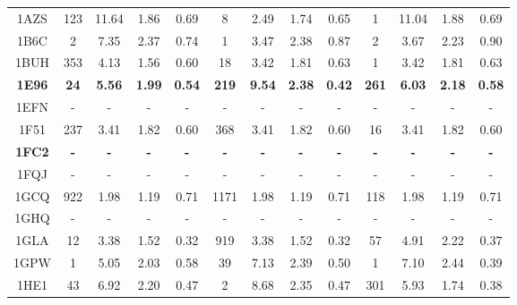 \begin{longtable}{c c c c c|c c c c|c c c c}
 {\tiny 1AZS} &{\tiny 123}&{\tiny 11.64}&{\tiny 1.86}&{\tiny 0.69} &{\tiny 8}&{\tiny 2.49}&{\tiny 1.74}&{\tiny 0.65} &{\tiny 1}&{\tiny 11.04}&{\tiny 1.88}&{\tiny 0.69}\\ 
 {\tiny 1B6C} &{\tiny 2}&{\tiny 7.35}&{\tiny 2.37}&{\tiny 0.74} &{\tiny 1}&{\tiny 3.47}&{\tiny 2.38}&{\tiny 0.87} &{\tiny 2}&{\tiny 3.67}&{\tiny 2.23}&{\tiny 0.90}\\ 
 {\tiny 1BUH} &{\tiny 353}&{\tiny 4.13}&{\tiny 1.56}&{\tiny 0.60} &{\tiny 18}&{\tiny 3.42}&{\tiny 1.81}&{\tiny 0.63} &{\tiny 1}&{\tiny 3.42}&{\tiny 1.81}&{\tiny 0.63}\\ 
 \textbf{\tiny 1E96} &\textbf{\tiny 24}&\textbf{\tiny 5.56}&\textbf{\tiny 1.99}&\textbf{\tiny 0.54} &\textbf{\tiny 219}&\textbf{\tiny 9.54}&\textbf{\tiny 2.38}&\textbf{\tiny 0.42} &\textbf{\tiny 261}&\textbf{\tiny 6.03}&\textbf{\tiny 2.18}&\textbf{\tiny 0.58}\\ 
 {\tiny 1EFN} &{\tiny -}&{\tiny -}&{\tiny -}&{\tiny -} &{\tiny -}&{\tiny -}&{\tiny -}&{\tiny -} &{\tiny -}&{\tiny -}&{\tiny -}&{\tiny -}\\ 
 {\tiny 1F51} &{\tiny 237}&{\tiny 3.41}&{\tiny 1.82}&{\tiny 0.60} &{\tiny 368}&{\tiny 3.41}&{\tiny 1.82}&{\tiny 0.60} &{\tiny 16}&{\tiny 3.41}&{\tiny 1.82}&{\tiny 0.60}\\ 
 \textbf{\tiny 1FC2} &\textbf{\tiny -}&\textbf{\tiny -}&\textbf{\tiny -}&\textbf{\tiny -} &\textbf{\tiny -}&\textbf{\tiny -}&\textbf{\tiny -}&\textbf{\tiny -} &\textbf{\tiny -}&\textbf{\tiny -}&\textbf{\tiny -}&\textbf{\tiny -}\\ 
 {\tiny 1FQJ} &{\tiny -}&{\tiny -}&{\tiny -}&{\tiny -} &{\tiny -}&{\tiny -}&{\tiny -}&{\tiny -} &{\tiny -}&{\tiny -}&{\tiny -}&{\tiny -}\\ 
 {\tiny 1GCQ} &{\tiny 922}&{\tiny 1.98}&{\tiny 1.19}&{\tiny 0.71} &{\tiny 1171}&{\tiny 1.98}&{\tiny 1.19}&{\tiny 0.71} &{\tiny 118}&{\tiny 1.98}&{\tiny 1.19}&{\tiny 0.71}\\ 
 {\tiny 1GHQ} &{\tiny -}&{\tiny -}&{\tiny -}&{\tiny -} &{\tiny -}&{\tiny -}&{\tiny -}&{\tiny -} &{\tiny -}&{\tiny -}&{\tiny -}&{\tiny -}\\ 
 {\tiny 1GLA} &{\tiny 12}&{\tiny 3.38}&{\tiny 1.52}&{\tiny 0.32} &{\tiny 919}&{\tiny 3.38}&{\tiny 1.52}&{\tiny 0.32} &{\tiny 57}&{\tiny 4.91}&{\tiny 2.22}&{\tiny 0.37}\\ 
 {\tiny 1GPW} &{\tiny 1}&{\tiny 5.05}&{\tiny 2.03}&{\tiny 0.58} &{\tiny 39}&{\tiny 7.13}&{\tiny 2.39}&{\tiny 0.50} &{\tiny 1}&{\tiny 7.10}&{\tiny 2.44}&{\tiny 0.39}\\ 
 {\tiny 1HE1} &{\tiny 43}&{\tiny 6.92}&{\tiny 2.20}&{\tiny 0.47} &{\tiny 2}&{\tiny 8.68}&{\tiny 2.35}&{\tiny 0.47} &{\tiny 301}&{\tiny 5.93}&{\tiny 1.74}&{\tiny 0.38}\\ 

\end{longtable}

